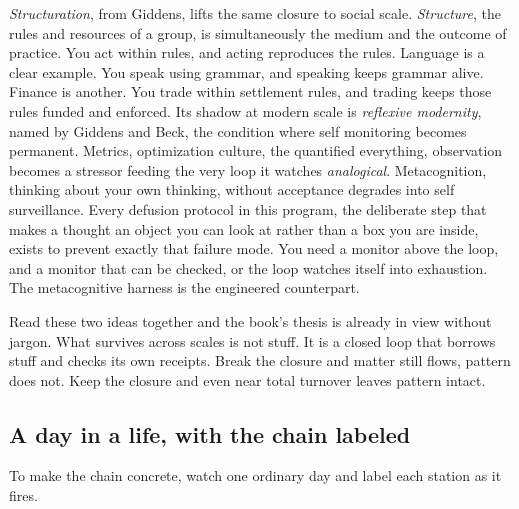 \textit{Structuration}, from Giddens, lifts the same closure to social scale. \textit{Structure}, the rules and resources of a group, is simultaneously the medium and the outcome of practice. You act within rules, and acting reproduces the rules. Language is a clear example. You speak using grammar, and speaking keeps grammar alive. Finance is another. You trade within settlement rules, and trading keeps those rules funded and enforced. Its shadow at modern scale is \textit{reflexive modernity}, named by Giddens and Beck, the condition where self monitoring becomes permanent. Metrics, optimization culture, the quantified everything, observation becomes a stressor feeding the very loop it watches \textit{analogical}. Metacognition, thinking about your own thinking, without acceptance degrades into self surveillance. Every defusion protocol in this program, the deliberate step that makes a thought an object you can look at rather than a box you are inside, exists to prevent exactly that failure mode. You need a monitor above the loop, and a monitor that can be checked, or the loop watches itself into exhaustion. The metacognitive harness \citep{cao2026} is the engineered counterpart.

Read these two ideas together and the book's thesis is already in view without jargon. What survives across scales is not stuff. It is a closed loop that borrows stuff and checks its own receipts. Break the closure and matter still flows, pattern does not. Keep the closure and even near total turnover leaves pattern intact.

\subsection*{A day in a life, with the chain labeled}

To make the chain concrete, watch one ordinary day and label each station as it fires.


